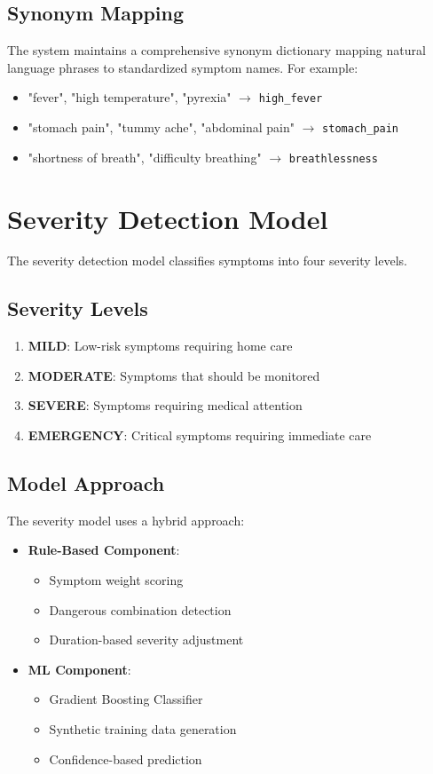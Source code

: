 \subsection{Synonym Mapping}
The system maintains a comprehensive synonym dictionary mapping natural language phrases to standardized symptom names. For example:

\begin{itemize}
    \item "fever", "high temperature", "pyrexia" $\rightarrow$ \texttt{high\_fever}
    \item "stomach pain", "tummy ache", "abdominal pain" $\rightarrow$ \texttt{stomach\_pain}
    \item "shortness of breath", "difficulty breathing" $\rightarrow$ \texttt{breathlessness}
\end{itemize}

\section{Severity Detection Model}
The severity detection model classifies symptoms into four severity levels.

\subsection{Severity Levels}
\begin{enumerate}
    \item \textbf{MILD}: Low-risk symptoms requiring home care
    \item \textbf{MODERATE}: Symptoms that should be monitored
    \item \textbf{SEVERE}: Symptoms requiring medical attention
    \item \textbf{EMERGENCY}: Critical symptoms requiring immediate care
\end{enumerate}

\subsection{Model Approach}
The severity model uses a hybrid approach:

\begin{itemize}
    \item \textbf{Rule-Based Component}:
    \begin{itemize}
        \item Symptom weight scoring
        \item Dangerous combination detection
        \item Duration-based severity adjustment
    \end{itemize}
    
    \item \textbf{ML Component}:
    \begin{itemize}
        \item Gradient Boosting Classifier
        \item Synthetic training data generation
        \item Confidence-based prediction
    \end{itemize}
\end{itemize}


